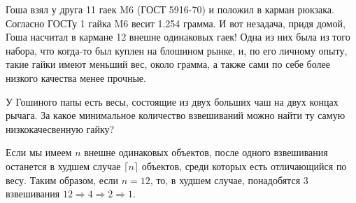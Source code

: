 
Гоша взял у друга 11 гаек M6 (ГОСТ 5916-70) и положил в карман рюкзака. Согласно ГОСТу 1  гайка M6 весит 1.254 грамма. И вот незадача, придя домой, Гоша насчитал в кармане 12  внешне одинаковых гаек! Одна из них была из того набора, что когда-то был куплен на блошином рынке, и, по его личному опыту, такие гайки имеют меньший вес, около грамма, а также сами по себе более низкого качества менее прочные. 

У Гошиного папы есть весы, состоящие из двух больших чаш на двух концах рычага. За какое минимальное количество взвешиваний можно найти ту самую низкокачесвенную гайку?

\solutionSection

Если мы имеем $n$ внешне одинаковых объектов, после одного взвешивания останется в худшем случае $\lceil n \rceil$ объектов, среди которых есть отличающийся по весу. Таким образом, если $n = 12$, то, в худшем случае, понадобятся 3 взвешивания $12\Rightarrow 4\Rightarrow 2\Rightarrow 1$.


